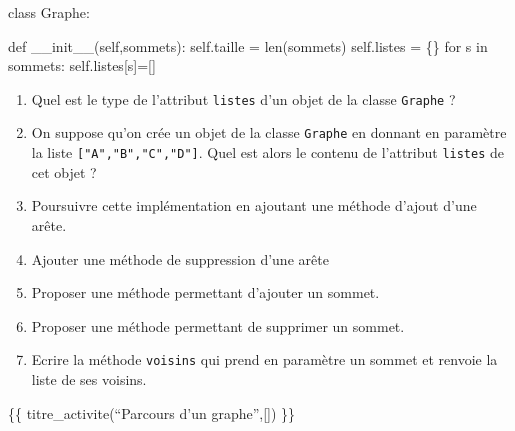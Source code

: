 \documentclass[
  letterpaper,
  DIV=11,
  numbers=noendperiod]{scrartcl}
\newenvironment{Shaded}{\begin{snugshade}}{\end{snugshade}}
\newcommand{\BuiltInTok}[1]{\textcolor[rgb]{0.00,0.23,0.31}{#1}}
\newcommand{\ControlFlowTok}[1]{\textcolor[rgb]{0.00,0.23,0.31}{#1}}
\newcommand{\FunctionTok}[1]{\textcolor[rgb]{0.28,0.35,0.67}{#1}}
\newcommand{\KeywordTok}[1]{\textcolor[rgb]{0.00,0.23,0.31}{#1}}
\newcommand{\NormalTok}[1]{\textcolor[rgb]{0.00,0.23,0.31}{#1}}
\newcommand{\OperatorTok}[1]{\textcolor[rgb]{0.37,0.37,0.37}{#1}}
\newcommand{\VariableTok}[1]{\textcolor[rgb]{0.07,0.07,0.07}{#1}}
\begin{document}
\begin{enumerate}
\begin{Shaded}
\begin{Highlighting}[]
\KeywordTok{class}\NormalTok{ Graphe:}

    \KeywordTok{def} \FunctionTok{\_\_init\_\_}\NormalTok{(}\VariableTok{self}\NormalTok{,sommets):}
        \VariableTok{self}\NormalTok{.taille }\OperatorTok{=} \BuiltInTok{len}\NormalTok{(sommets)}
        \VariableTok{self}\NormalTok{.listes }\OperatorTok{=}\NormalTok{ \{\}}
        \ControlFlowTok{for}\NormalTok{ s }\KeywordTok{in}\NormalTok{ sommets:}
            \VariableTok{self}\NormalTok{.listes[s]}\OperatorTok{=}\NormalTok{[]}
\end{Highlighting}
\end{Shaded}

  \begin{enumerate}
  \def\labelenumii{\alph{enumii}.}
  \item
    Quel est le type de l'attribut \texttt{listes} d'un objet de la
    classe \texttt{Graphe} ?
  \item
    On suppose qu'on crée un objet de la classe \texttt{Graphe} en
    donnant en paramètre la liste \texttt{{[}"A","B","C","D"{]}}. Quel
    est alors le contenu de l'attribut \texttt{listes} de cet objet ?
  \item
    Poursuivre cette implémentation en ajoutant une méthode d'ajout
    d'une arête.
  \item
    Ajouter une méthode de suppression d'une arête
  \item
    Proposer une méthode permettant d'ajouter un sommet.
  \item
    Proposer une méthode permettant de supprimer un sommet.
  \item
    Ecrire la méthode \texttt{voisins} qui prend en paramètre un sommet
    et renvoie la liste de ses voisins.
  \end{enumerate}
\end{enumerate}

\{\{ titre\_activite(``Parcours d'un graphe'',{[}{]}) \}\}
\end{document}
